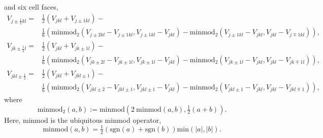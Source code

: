 \documentclass{aastex63}
\begin{document}
and six cell faces,
\begin{equation}
\begin{split}
V_{j \pm \tfrac{1}{2} k l } = & 
\frac{1}{2}\left(V_{ j k l } + V_{j \pm 1 k l}\right) - \\
& \frac{1}{6}\left(
\mathrm{minmod}_2 \left(V_{j \pm 2 k l} - V_{j \pm 1 k l }, V_{j \pm 1 k l} - V_{j k l }   \right) -
\mathrm{minmod}_2 \left(V_{j \pm 1 k l} - V_{j k l}, V_{j k l } - V_{j \mp 1 k l}   \right)
\right),
\end{split}
\end{equation}
\begin{equation}
\begin{split}
V_{j  k \pm \tfrac{1}{2} l} = & 
\frac{1}{2}\left(V_{ j k l } + V_{j k \pm 1 l}\right) - \\
& \frac{1}{6}\left(
\mathrm{minmod}_2 \left(V_{j k \pm 2 l} - V_{j k \pm 1 l }, V_{j k \pm 1 l } - V_{j k l }   \right) -
\mathrm{minmod}_2 \left(V_{j k \pm 1 l} - V_{j k l}, V_{j k l } - V_{j k \mp 1 l }   \right)
\right),
\end{split}
\end{equation}
\begin{equation}
\begin{split}
V_{j  k l \pm \tfrac{1}{2}} = & 
\frac{1}{2}\left(V_{ j k l } + V_{j k l \pm 1}\right) - \\
& \frac{1}{6}\left(
\mathrm{minmod}_2 \left(V_{j k l \pm 2} - V_{j k l \pm  1}, V_{j k l \pm 1} - V_{j k l }   \right) -
\mathrm{minmod}_2 \left(V_{j k l \pm 1} - V_{j k l}, V_{j k l } - V_{j k l \mp 1 }   \right)
\right),
\end{split}
\end{equation}
where
\begin{equation}
\mathrm{minmod}_2 \left( a, b \right) := \mathrm{minmod} \left( 2 \ \mathrm{minmod}\left(a,b\right), \tfrac{1}{2}\left(a + b\right)\right).
\end{equation}
Here, $\mathrm{minmod}$ is the ubiquitous minmod operator, 
\begin{equation}
\mathrm{minmod}\left(a,b\right) = \tfrac{1}{2}\left(\mathrm{sgn}\left(a\right)+\mathrm{sgn}\left(b\right)\right) \mathrm{min}\left( | a |, | b | \right).
\end{equation}






\end{document}

